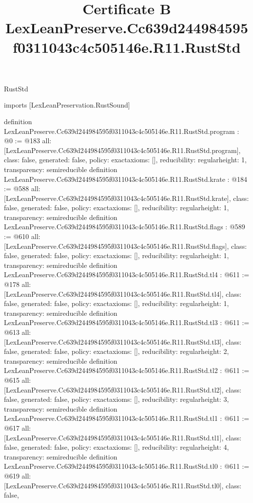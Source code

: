 \begin{lexlean}{RustStd}
\title{Certificate B LexLeanPreserve.Cc639d244984595f0311043c4c505146e.R11.RustStd}
\begin{coremodule}
imports [LexLeanPreservation.RustSound]

definition LexLeanPreserve.Cc639d244984595f0311043c4c505146e.R11.RustStd.program : @0 := @183 {
  all: [LexLeanPreserve.Cc639d244984595f0311043c4c505146e.R11.RustStd.program],
  class: false,
  generated: false,
  policy: exact{axioms: []},
  reducibility: regular{height: 1},
  transparency: semireducible
}
definition LexLeanPreserve.Cc639d244984595f0311043c4c505146e.R11.RustStd.krate : @184 := @588 {
  all: [LexLeanPreserve.Cc639d244984595f0311043c4c505146e.R11.RustStd.krate],
  class: false,
  generated: false,
  policy: exact{axioms: []},
  reducibility: regular{height: 1},
  transparency: semireducible
}
definition LexLeanPreserve.Cc639d244984595f0311043c4c505146e.R11.RustStd.flags : @589 := @610 {
  all: [LexLeanPreserve.Cc639d244984595f0311043c4c505146e.R11.RustStd.flags],
  class: false,
  generated: false,
  policy: exact{axioms: []},
  reducibility: regular{height: 1},
  transparency: semireducible
}
definition LexLeanPreserve.Cc639d244984595f0311043c4c505146e.R11.RustStd.tl4 : @611 := @178 {
  all: [LexLeanPreserve.Cc639d244984595f0311043c4c505146e.R11.RustStd.tl4],
  class: false,
  generated: false,
  policy: exact{axioms: []},
  reducibility: regular{height: 1},
  transparency: semireducible
}
definition LexLeanPreserve.Cc639d244984595f0311043c4c505146e.R11.RustStd.tl3 : @611 := @613 {
  all: [LexLeanPreserve.Cc639d244984595f0311043c4c505146e.R11.RustStd.tl3],
  class: false,
  generated: false,
  policy: exact{axioms: []},
  reducibility: regular{height: 2},
  transparency: semireducible
}
definition LexLeanPreserve.Cc639d244984595f0311043c4c505146e.R11.RustStd.tl2 : @611 := @615 {
  all: [LexLeanPreserve.Cc639d244984595f0311043c4c505146e.R11.RustStd.tl2],
  class: false,
  generated: false,
  policy: exact{axioms: []},
  reducibility: regular{height: 3},
  transparency: semireducible
}
definition LexLeanPreserve.Cc639d244984595f0311043c4c505146e.R11.RustStd.tl1 : @611 := @617 {
  all: [LexLeanPreserve.Cc639d244984595f0311043c4c505146e.R11.RustStd.tl1],
  class: false,
  generated: false,
  policy: exact{axioms: []},
  reducibility: regular{height: 4},
  transparency: semireducible
}
definition LexLeanPreserve.Cc639d244984595f0311043c4c505146e.R11.RustStd.tl0 : @611 := @619 {
  all: [LexLeanPreserve.Cc639d244984595f0311043c4c505146e.R11.RustStd.tl0],
  class: false,
}
\end{coremodule}
\end{lexlean}
